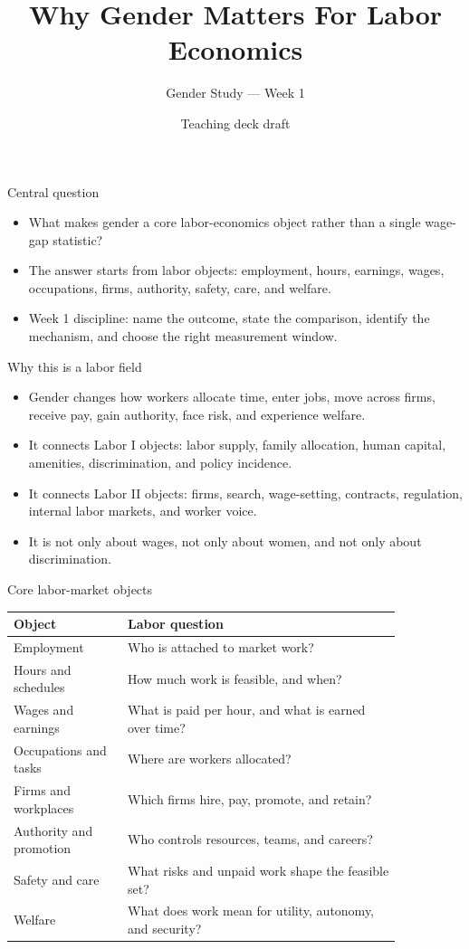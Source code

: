 \documentclass[aspectratio=169,11pt]{beamer}
\title{Why Gender Matters For Labor Economics}
\subtitle{Gender Study --- Week 1}
\author{Teaching deck draft}
\date{}
\begin{document}
\begin{frame}
  \titlepage
\end{frame}

\begin{frame}{Central question}
\begin{itemize}
    \item What makes gender a core labor-economics object rather than a single wage-gap statistic?
    \item The answer starts from labor objects: employment, hours, earnings, wages, occupations, firms, authority, safety, care, and welfare.
    \item Week 1 discipline: name the outcome, state the comparison, identify the mechanism, and choose the right measurement window.
\end{itemize}
\end{frame}

\begin{frame}{Why this is a labor field}
\begin{itemize}
    \item Gender changes how workers allocate time, enter jobs, move across firms, receive pay, gain authority, face risk, and experience welfare.
    \item It connects Labor I objects: labor supply, family allocation, human capital, amenities, discrimination, and policy incidence.
    \item It connects Labor II objects: firms, search, wage-setting, contracts, regulation, internal labor markets, and worker voice.
    \item It is not only about wages, not only about women, and not only about discrimination.
\end{itemize}
\end{frame}

\begin{frame}{Core labor-market objects}
\small
\begin{tabular}{p{0.25\linewidth} p{0.60\linewidth}}
\toprule
Object & Labor question \\
\midrule
Employment & Who is attached to market work? \\
Hours and schedules & How much work is feasible, and when? \\
Wages and earnings & What is paid per hour, and what is earned over time? \\
Occupations and tasks & Where are workers allocated? \\
Firms and workplaces & Which firms hire, pay, promote, and retain? \\
Authority and promotion & Who controls resources, teams, and careers? \\
Safety and care & What risks and unpaid work shape the feasible set? \\
Welfare & What does work mean for utility, autonomy, and security? \\
\bottomrule
\end{tabular}
\end{frame}
\end{document}
